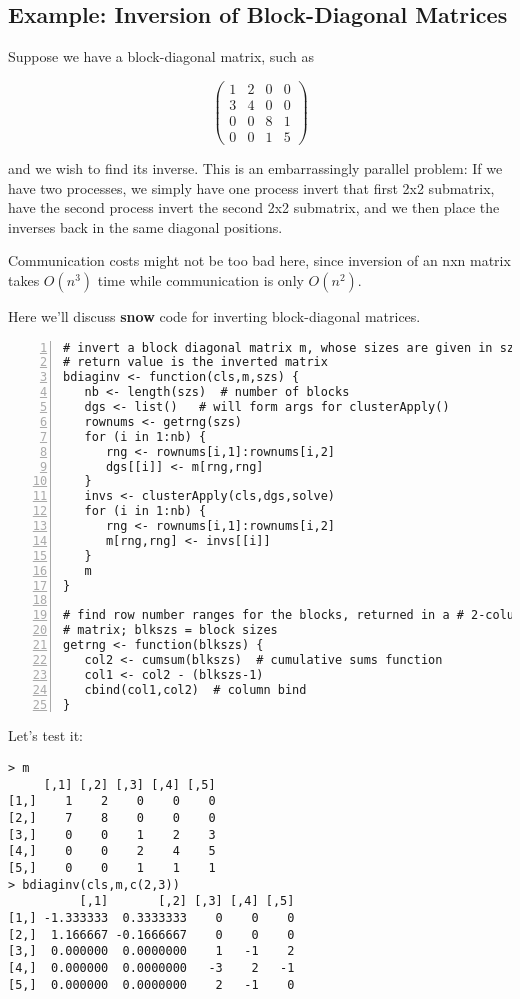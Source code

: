 \subsection{Example:  Inversion of Block-Diagonal Matrices}
\label{blkd}

Suppose we have a block-diagonal matrix, such as

$$
\left (
   \begin{array}{cccc}
   1 & 2 & 0 & 0 \\
   3 & 4 & 0 & 0 \\
   0 & 0 & 8 & 1 \\
   0 & 0 & 1 & 5
   \end{array}
\right )
$$

\noindent
and we wish to find its inverse.  This is an embarrassingly parallel
problem:  If we have two processes, we simply have one process invert that
first 2x2 submatrix, have the second process invert the second 2x2
submatrix, and we then place the inverses back in the same diagonal
positions.

Communication costs might not be too bad here, since inversion of an nxn
matrix takes $O(n^3)$ time while communication is only $O(n^2)$.

Here we'll discuss {\bf snow} code for inverting block-diagonal matrices.

\begin{lstlisting}[numbers=left]
# invert a block diagonal matrix m, whose sizes are given in szs;
# return value is the inverted matrix
bdiaginv <- function(cls,m,szs) {
   nb <- length(szs)  # number of blocks
   dgs <- list()   # will form args for clusterApply()
   rownums <- getrng(szs)
   for (i in 1:nb) {
      rng <- rownums[i,1]:rownums[i,2]
      dgs[[i]] <- m[rng,rng]
   }
   invs <- clusterApply(cls,dgs,solve)
   for (i in 1:nb) {
      rng <- rownums[i,1]:rownums[i,2]
      m[rng,rng] <- invs[[i]]
   }
   m
}

# find row number ranges for the blocks, returned in a # 2-column
# matrix; blkszs = block sizes
getrng <- function(blkszs) {
   col2 <- cumsum(blkszs)  # cumulative sums function
   col1 <- col2 - (blkszs-1)
   cbind(col1,col2)  # column bind
}
\end{lstlisting}

Let's test it:

\begin{lstlisting}
> m
     [,1] [,2] [,3] [,4] [,5]
[1,]    1    2    0    0    0
[2,]    7    8    0    0    0
[3,]    0    0    1    2    3
[4,]    0    0    2    4    5
[5,]    0    0    1    1    1
> bdiaginv(cls,m,c(2,3))
          [,1]       [,2] [,3] [,4] [,5]
[1,] -1.333333  0.3333333    0    0    0
[2,]  1.166667 -0.1666667    0    0    0
[3,]  0.000000  0.0000000    1   -1    2
[4,]  0.000000  0.0000000   -3    2   -1
[5,]  0.000000  0.0000000    2   -1    0
\end{lstlisting}


